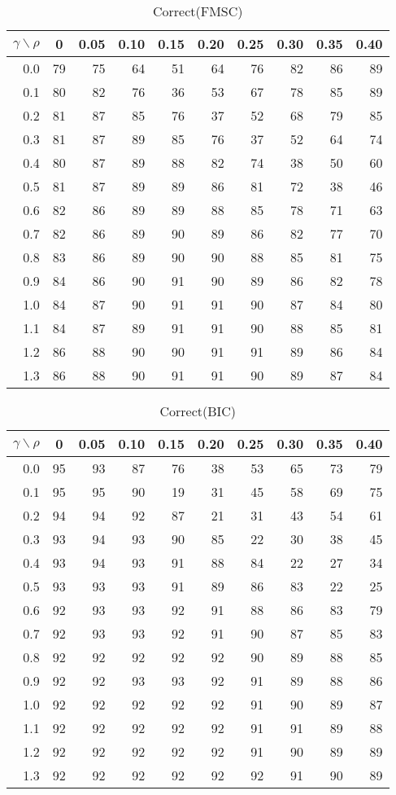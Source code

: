 \documentclass[12pt]{article}
\begin{document}
%
\begin{table}[!tbp]
\caption{Correct(FMSC)}
 \begin{center}
 \begin{tabular}{r|rrrrrrrrr}\hline\hline
\multicolumn{1}{c|}{$\gamma\backslash\rho$}&\multicolumn{1}{c}{0}&\multicolumn{1}{c}{0.05}&\multicolumn{1}{c}{0.10}&\multicolumn{1}{c}{0.15}&\multicolumn{1}{c}{0.20}&\multicolumn{1}{c}{0.25}&\multicolumn{1}{c}{0.30}&\multicolumn{1}{c}{0.35}&\multicolumn{1}{c}{0.40}\tabularnewline
\hline

0.0&79&75&64&51&64&76&82&86&89\tabularnewline
0.1&80&82&76&36&53&67&78&85&89\tabularnewline
0.2&81&87&85&76&37&52&68&79&85\tabularnewline
0.3&81&87&89&85&76&37&52&64&74\tabularnewline
0.4&80&87&89&88&82&74&38&50&60\tabularnewline
0.5&81&87&89&89&86&81&72&38&46\tabularnewline
0.6&82&86&89&89&88&85&78&71&63\tabularnewline
0.7&82&86&89&90&89&86&82&77&70\tabularnewline
0.8&83&86&89&90&90&88&85&81&75\tabularnewline
0.9&84&86&90&91&90&89&86&82&78\tabularnewline
1.0&84&87&90&91&91&90&87&84&80\tabularnewline
1.1&84&87&89&91&91&90&88&85&81\tabularnewline
1.2&86&88&90&90&91&91&89&86&84\tabularnewline
1.3&86&88&90&91&91&90&89&87&84\tabularnewline
\hline
\end{tabular}

\end{center}

\end{table}

%
\begin{table}[!tbp]
\caption{Correct(BIC)}
 \begin{center}
 \begin{tabular}{r|rrrrrrrrr}\hline\hline
\multicolumn{1}{c|}{$\gamma\backslash\rho$}&\multicolumn{1}{c}{0}&\multicolumn{1}{c}{0.05}&\multicolumn{1}{c}{0.10}&\multicolumn{1}{c}{0.15}&\multicolumn{1}{c}{0.20}&\multicolumn{1}{c}{0.25}&\multicolumn{1}{c}{0.30}&\multicolumn{1}{c}{0.35}&\multicolumn{1}{c}{0.40}\tabularnewline
\hline

0.0&95&93&87&76&38&53&65&73&79\tabularnewline
0.1&95&95&90&19&31&45&58&69&75\tabularnewline
0.2&94&94&92&87&21&31&43&54&61\tabularnewline
0.3&93&94&93&90&85&22&30&38&45\tabularnewline
0.4&93&94&93&91&88&84&22&27&34\tabularnewline
0.5&93&93&93&91&89&86&83&22&25\tabularnewline
0.6&92&93&93&92&91&88&86&83&79\tabularnewline
0.7&92&93&93&92&91&90&87&85&83\tabularnewline
0.8&92&92&92&92&92&90&89&88&85\tabularnewline
0.9&92&92&93&93&92&91&89&88&86\tabularnewline
1.0&92&92&92&92&92&91&90&89&87\tabularnewline
1.1&92&92&92&92&92&91&91&89&88\tabularnewline
1.2&92&92&92&92&92&91&90&89&89\tabularnewline
1.3&92&92&92&92&92&92&91&90&89\tabularnewline
\hline
\end{tabular}

\end{center}

\end{table}
\end{document}
